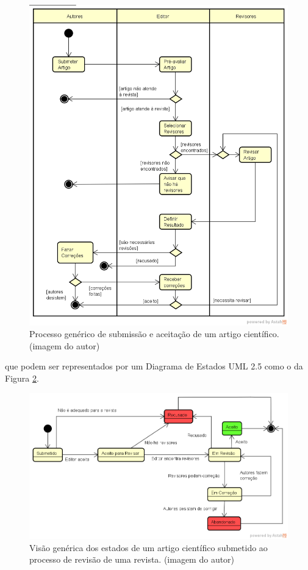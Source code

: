 \documentclass[openany]{book}
\begin{document}
\begin{figure}
    \centering
    \includegraphics[width=0.7\linewidth]{imagens/ProcessoDeSubmissao.png}
    \caption[Processo genérico de submissão e aceitação de um artigo científico]{Processo genérico de submissão e aceitação de um artigo científico. (imagem do autor)}
    \label{fig:processo}
\end{figure}

 que podem ser representados por um Diagrama  de Estados UML 2.5 como o da Figura \ref{fig:maquina}.

\begin{figure}
    \centering
    \includegraphics[width=0.7\linewidth]{imagens/MaquinaEstadoArtigo.png}
    \caption[Visão genérica dos estados de um artigo científico]{Visão genérica dos estados de um artigo científico submetido ao processo de revisão de uma revista. (imagem do autor)}
    \label{fig:maquina}
\end{figure}
\end{document}

